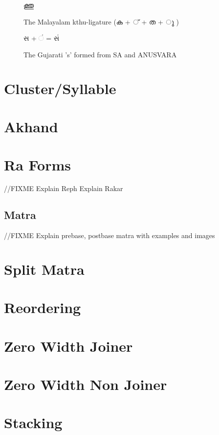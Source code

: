 \begin{figure}[h]
   \centering
   {\malayalam\textexample  ക്തു}
   \caption{The Malayalam kthu-ligature {\malayalam (ക + ് + ത + ു ) } }
\end{figure}

\begin{figure}[h]
  \centering
  {\gujarati\textexample સ +  ં = સં}
  \caption{The Gujarati 's' formed from SA and ANUSVARA}
\end{figure}

\section{Cluster/Syllable }

\section{Akhand }

\section{Ra Forms }
//FIXME
Explain Reph
Explain Rakar

\subsection*{Matra}
//FIXME
Explain prebase, postbase matra with examples and images

\section{Split Matra }

\section{Reordering }

\section{Zero Width Joiner }

\section{Zero Width Non Joiner }

\section{Stacking }

